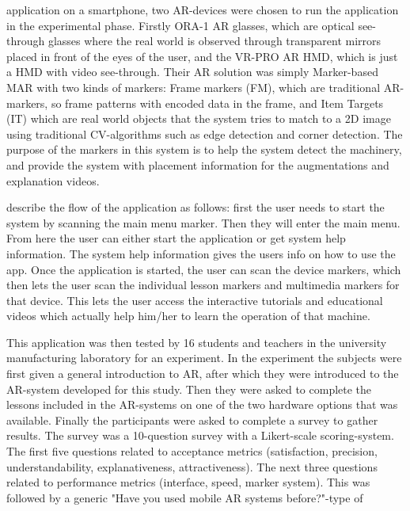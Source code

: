 application on a smartphone, two AR-devices were chosen to run the 
application in the experimental phase. Firstly ORA-1 AR glasses, which are 
optical see-through glasses where the real world is observed through 
transparent mirrors placed in front of the eyes of the user, and the VR-PRO 
AR HMD, which is just a HMD with video see-through.\cite{reyesEtAl2016} Their 
AR solution was simply Marker-based MAR with two kinds of markers: Frame 
markers (FM), which are traditional AR-markers, so frame patterns with encoded 
data in the frame, and Item Targets (IT) which are real world objects that 
the system tries to match to a 2D image using traditional CV-algorithms such 
as edge detection and corner detection.\cite{reyesEtAl2016} The purpose of the 
markers in this system is to help the system detect the machinery, and 
provide the system with placement information for the augmentations and 
explanation videos.\cite{reyesEtAl2016}\par
	\textcite{reyesEtAl2016} describe the flow of the application as 
follows: first the user needs to start the system by scanning the main menu 
marker. Then they will enter the main menu. From here the user can either 
start the application or get system help information. The system help 
information gives the users info on how to use the app. Once the application 
is started, the user can scan the device markers, which then lets the user 
scan the individual lesson markers and multimedia markers for that device. 
This lets the user access the interactive tutorials and educational videos 
which actually help him/her to learn the operation of that 
machine.\cite{reyesEtAl2016}\par
	This application was then tested by 16 students and teachers in the 
university manufacturing laboratory for an experiment.\cite{reyesEtAl2016} In 
the experiment the subjects were first given a general introduction to AR, 
after which they were introduced to the AR-system developed for this study. 
Then they were asked to complete the lessons included in the AR-systems on 
one of the two hardware options that was available. Finally the participants 
were asked to complete a survey to gather results.\cite{reyesEtAl2016} The 
survey was a 10-question survey with a Likert-scale scoring-system. The first 
five questions related to acceptance metrics (satisfaction, precision, 
understandability, explanativeness, attractiveness). The next three questions 
related to performance metrics (interface, speed, marker system). This was 
followed by a generic "Have you used mobile AR systems before?"-type of 

